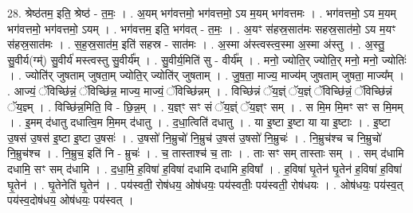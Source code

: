 \documentclass[17pt]{extarticle}
\begin{document}
28. श्रेष्ठ॑तम॒ इति॒ श्रेष्ठ॑ - त॒मः॒ । . अ॒यम् भग॑वत्तमो॒ भग॑वत्तमो॒ ऽय म॒यम् भग॑वत्तमः । . भग॑वत्तमो॒ ऽय म॒यम् भग॑वत्तमो॒ भग॑वत्तमो॒ ऽयम् । . भग॑वत्तम॒ इति॒ भग॑वत् - त॒मः॒ । . अ॒यꣳ स॑हस्र॒सात॑मः सहस्र॒सात॑मो॒ ऽय म॒यꣳ स॑हस्र॒सात॑मः । . स॒ह॒स्र॒सात॑म॒ इति॑ सहस्र - सात॑मः । . अ॒स्मा अ॑स्त्वस्त्व॒स्मा अ॒स्मा अ॑स्तु । . अ॒स्तु॒ सु॒वीर्य(ग्म्॑) सु॒वीर्य॑ मस्त्वस्तु सु॒वीर्य᳚म् । . सु॒वीर्य॒मिति॑ सु - वीर्य᳚म् । . मनो॒ ज्योति॒र् ज्योति॒र् मनो॒ मनो॒ ज्योतिः॑ । . ज्योति॑र् जुषताम् जुषता॒म् ज्योति॒र् ज्योति॑र् जुषताम् । . जु॒ष॒ता॒ माज्य॒ माज्य॑म् जुषताम् जुषता॒ माज्य᳚म् । . आज्यं॒ ॅविच्छि॑न्नं॒ ॅविच्छि॑न्न॒ माज्य॒ माज्यं॒ ॅविच्छि॑न्नम् । . विच्छि॑न्नं ॅय॒ज्ञ्ं ॅय॒ज्ञ्ं ॅविच्छि॑न्नं॒ ॅविच्छि॑न्नं ॅय॒ज्ञ्म् । . विच्छि॑न्न॒मिति॒ वि - छि॒न्न॒म् । . य॒ज्ञ्ꣳ सꣳ सं ॅय॒ज्ञ्ं ॅय॒ज्ञ्ꣳ सम् । . स मि॒म मि॒मꣳ सꣳ स मि॒मम् । . इ॒मम् द॑धातु दधात्वि॒म मि॒मम् द॑धातु । . द॒धा॒त्विति॑ दधातु । . या इ॒ष्टा इ॒ष्टा या या इ॒ष्टाः । . इ॒ष्टा उ॒षस॑ उ॒षस॑ इ॒ष्टा इ॒ष्टा उ॒षसः॑ । . उ॒षसो॑ नि॒म्रुचो॑ नि॒म्रुच॑ उ॒षस॑ उ॒षसो॑ नि॒म्रुचः॑ । . नि॒म्रुच॑श्च च नि॒म्रुचो॑ नि॒म्रुच॑श्च । . नि॒म्रुच॒ इति॑ नि - म्रुचः॑ । . च॒ तास्ताश्च॑ च॒ ताः । . ताः सꣳ सम् तास्ताः सम् । . सम् द॑धामि दधामि॒ सꣳ सम् द॑धामि । . द॒धा॒मि॒ ह॒विषा॑ ह॒विषा॑ दधामि दधामि ह॒विषा᳚ । . ह॒विषा॑ घृ॒तेन॑ घृ॒तेन॑ ह॒विषा॑ ह॒विषा॑ घृ॒तेन॑ । . घृ॒तेनेति॑ घृ॒तेन॑ । . पय॑स्वती॒ रोष॑धय॒ ओष॑धयः॒ पय॑स्वतीः॒ पय॑स्वती॒ रोष॑धयः । . ओष॑धयः॒ पय॑स्व॒त् पय॑स्व॒दोष॑धय॒ ओष॑धयः॒ पय॑स्वत् । \newline
\end{document}
